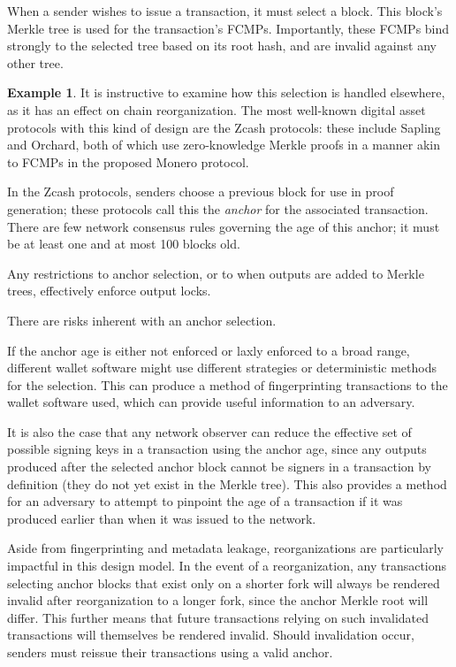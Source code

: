 \documentclass{article}
\theoremstyle{definition}
\newtheorem*{example}{Example}
\begin{document}
When a sender wishes to issue a transaction, it must select a block.
This block's Merkle tree is used for the transaction's FCMPs.
Importantly, these FCMPs bind strongly to the selected tree based on its root hash, and are invalid against any other tree.

\begin{example}
It is instructive to examine how this selection is handled elsewhere, as it has an effect on chain reorganization.
The most well-known digital asset protocols with this kind of design are the Zcash protocols: these include Sapling and Orchard, both of which use zero-knowledge Merkle proofs in a manner akin to FCMPs in the proposed Monero protocol.

In the Zcash protocols, senders choose a previous block for use in proof generation; these protocols call this the \textit{anchor} for the associated transaction.
There are few network consensus rules governing the age of this anchor; it must be at least one and at most 100 blocks old.
\end{example}

Any restrictions to anchor selection, or to when outputs are added to Merkle trees, effectively enforce output locks.

There are risks inherent with an anchor selection.

If the anchor age is either not enforced or laxly enforced to a broad range, different wallet software might use different strategies or deterministic methods for the selection.
This can produce a method of fingerprinting transactions to the wallet software used, which can provide useful information to an adversary.

It is also the case that any network observer can reduce the effective set of possible signing keys in a transaction using the anchor age, since any outputs produced after the selected anchor block cannot be signers in a transaction by definition (they do not yet exist in the Merkle tree).
This also provides a method for an adversary to attempt to pinpoint the age of a transaction if it was produced earlier than when it was issued to the network.

Aside from fingerprinting and metadata leakage, reorganizations are particularly impactful in this design model.
In the event of a reorganization, any transactions selecting anchor blocks that exist only on a shorter fork will always be rendered invalid after reorganization to a longer fork, since the anchor Merkle root will differ.
This further means that future transactions relying on such invalidated transactions will themselves be rendered invalid.
Should invalidation occur, senders must reissue their transactions using a valid anchor.
\end{document}
